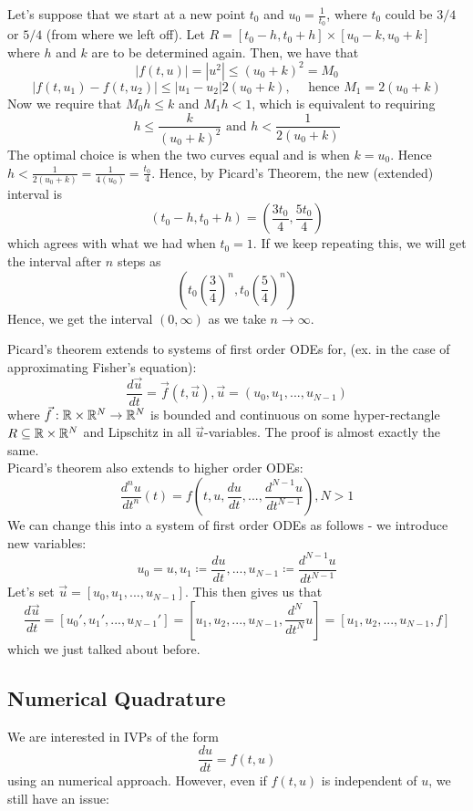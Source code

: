 \documentclass{article}
\begin{document}
\begin{example}
    Let's suppose that we start at a new point $t_0$ and $u_0 = \frac{1}{t_0}$, where $t_0$ could be $3/4$ or $5/4$ (from where we left off). Let $R = [t_0 - h, t_0 + h] \times [u_0 - k, u_0 + k]$ where $h$ and $k$ are to be determined again. Then, we have that
    \[|f(t, u)| = |u^2| \leq (u_0 + k)^2 = M_0\]
    \[|f(t, u_1) - f(t, u_2)| \leq |u_1 - u_2| 2(u_0 + k),\quad \text{ hence } M_1 = 2(u_0 + k)\]
    Now we require that $M_0 h \leq k$ and $M_1 h < 1$, which is equivalent to requiring
    \[h \leq \frac{k}{(u_0 + k)^2} \text{ and } h < \frac{1}{2(u_0 + k)}\]
    The optimal choice is when the two curves equal and is when $k = u_0$. Hence $h < \frac{1}{2(u_0 + k)} = \frac{1}{4(u_0)} = \frac{t_0}{4}$. Hence, by Picard's Theorem, the new (extended) interval is 
    \[(t_0 - h, t_0 + h) = (\frac{3 t_0}{4}, \frac{5 t_0}{4})\]
    which agrees with what we had when $t_0 = 1$. If we keep repeating this, we will get the interval after $n$ steps as
    \[(t_0 (\frac{3}{4})^n, t_0 (\frac{5}{4})^n)\]
    Hence, we get the interval $(0, \infty)$ as we take $n \to \infty$.
\end{example}

\begin{remark}
    Picard's theorem extends to systems of first order ODEs for, (ex. in the case of approximating Fisher's equation):
    \[\frac{d\Vec{u}}{dt} = \Vec{f}(t, \Vec{u}), \Vec{u} = (u_0, u_1, ..., u_{N-1}) \]
    where $\Vec{f}: \mathbb{R} \times \mathbb{R}^N \to \mathbb{R}^N$ is bounded and continuous on some hyper-rectangle $R \subseteq \mathbb{R} \times \mathbb{R}^N$ and Lipschitz in all $\Vec{u}$-variables. The proof is almost exactly the same.\\

    Picard's theorem also extends to higher order ODEs:
    \[\frac{d^n u}{dt^n}(t) = f(t, u, \frac{du}{dt}, ..., \frac{d^{N-1} u}{dt^{N-1}}), N > 1\]
    We can change this into a system of first order ODEs as follows - we introduce new variables:
    \[u_0 = u, u_1 \coloneqq \frac{du}{dt}, ..., u_{N-1} \coloneqq \frac{d^{N-1}u}{dt^{N-1}} \]
    Let's set $\Vec{u} = [u_0, u_1, ..., u_{N-1}]$. This then gives us that
    \[\frac{d\Vec{u}}{dt} = [u_0', u_1', ..., u_{N-1}'] = [u_1, u_2, ..., u_{N-1}, \frac{d^N}{dt^N} u] = [u_1, u_2, ..., u_{N-1}, f]\]
    which we just talked about before.
\end{remark}

\subsection{Numerical Quadrature}
We are interested in IVPs of the form
\[\frac{du}{dt} = f(t, u)\]
using an numerical approach. However, even if $f(t, u)$ is independent of $u$, we still have an issue:\\
\end{document}
